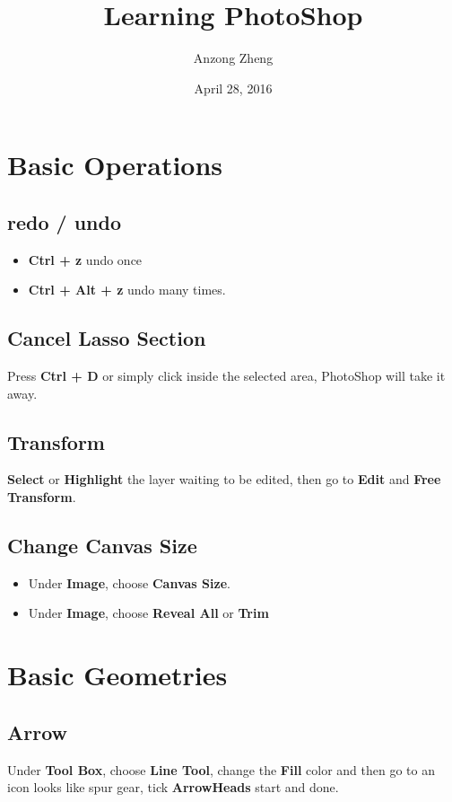 \documentclass[10pt,a4paper]{article}
\begin{document}
\author{Anzong Zheng}
\title{Learning PhotoShop}
\date{April 28, 2016}
\maketitle

\tableofcontents

\newpage\clearpage\setcounter{page}{1}

\section{Basic Operations}
\subsection{redo / undo}
\begin{itemize}
\item \textbf{Ctrl + z} undo once
\item \textbf{Ctrl + Alt + z} undo many times.
\end{itemize}
\subsection{Cancel Lasso Section}
Press \textbf{Ctrl + D} or simply click inside the selected area, PhotoShop will take it away.
\subsection{Transform}
\textbf{Select} or \textbf{Highlight} the layer waiting to be edited, then go to \textbf{Edit} and \textbf{Free Transform}.

\subsection{Change Canvas Size}
\begin{itemize}
\item Under \textbf{Image}, choose \textbf{Canvas Size}.
\item Under \textbf{Image}, choose \textbf{Reveal All} or \textbf{Trim}
\end{itemize}


\section{Basic Geometries}
\subsection{Arrow}
Under \textbf{Tool Box}, choose \textbf{Line Tool}, change the \textbf{Fill} color and then go to an icon looks like spur gear, tick \textbf{ArrowHeads} start and done.
\end{document}

